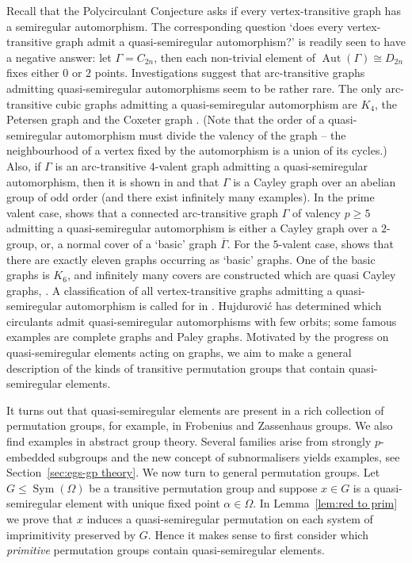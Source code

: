 \documentclass{article}
\theoremstyle{remark}
\theoremstyle{definition}
\DeclareMathOperator{\Sym}{Sym}
\DeclareMathOperator{\Aut}{Aut}
\newcommand{\qsr}{quasi-semiregular}
\newcommand{\qsre}{quasi-semiregular element}
\newcommand{\qsres}{quasi-semiregular elements}
\begin{document}
 Recall that the Polycirculant Conjecture asks if every vertex-transitive graph has a semiregular automorphism.
The corresponding question `does every vertex-transitive graph admit a {\qsr} automorphism?' is readily seen to have a negative answer: let $\Gamma=C_{2n}$, then each non-trivial element of $\Aut(\Gamma)\cong D_{2n}$  fixes either  $0$ or $2$ points.  Investigations suggest that arc-transitive graphs admitting {\qsr} automorphisms seem to be rather rare. The only  arc-transitive cubic graphs admitting a {\qsr} automorphism are  $K_4$, the Petersen graph and the Coxeter graph   \cite[Theorem 1.1]{FengHujetal}. 
(Note that the order of a {\qsr} automorphism must divide the valency of the graph -- the neighbourhood of a vertex fixed by the automorphism is a union of its cycles.)
Also, if $\Gamma$ is an arc-transitive $4$-valent graph admitting a {\qsr} automorphism, then it is shown in \cite[Theorem 1.1]{FengHujetal} and \cite{YinFeng2021} that $\Gamma$ is a Cayley graph over an abelian group of odd order (and there exist infinitely many examples). In the prime valent case, \cite[Theorem 1.1]{Yinetal2023} shows that a connected arc-transitive graph $\Gamma$ of valency $p\geqslant 5$ admitting a {\qsr} automorphism is either a Cayley graph over a $2$-group, or, a normal cover of a `basic' graph $\overline{\Gamma}$.
For the $5$-valent case, \cite[Theorem 1.2]{Yinetal2023} shows that there are exactly eleven graphs occurring as `basic' graphs. One of the basic graphs is $K_6$, and infinitely many covers are constructed   which are quasi Cayley graphs, \cite[Theorem 1.3]{Yinetal2023}. 
A classification of all vertex-transitive graphs admitting a {\qsr} automorphism is called for in \cite[Problem A]{Yinetal2023}.
Hujdurovi\'{c} \cite[Theorem 1.1--1.3]{Hujdurovic2013} has determined which circulants  admit {\qsr} automorphisms with few orbits; some famous examples are  complete graphs and  Paley graphs. Motivated by the progress on {\qsres} acting on graphs, we aim to make a general description of the kinds of transitive permutation groups that contain {\qsres}.  

\medskip
{} \quad 
 It turns out that {\qsres} are present in a rich collection of permutation groups, for example, in Frobenius  and Zassenhaus groups. {  We also find examples  in abstract  group theory. Several families arise from strongly $p$-embedded subgroups and the new concept of subnormalisers yields examples, see Section~\ref{sec:egs-gp theory}.}
 We now turn to general permutation groups. 
Let $G \leqslant \Sym(\Omega)$ be a transitive permutation group and suppose $x\in G$ is a {\qsre} with unique fixed point $\alpha \in \Omega$. 
{  In Lemma~\ref{lem:red to prim} we prove that $x$ induces a {\qsr} permutation on each system of imprimitivity preserved by $G$.}
Hence it makes sense to first consider which \emph{primitive} permutation groups contain {\qsres}. 
\end{document}
